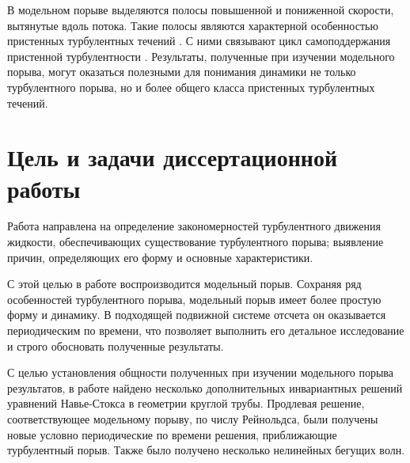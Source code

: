 \begin{comment}
Решение, соответствующее модельному порыву, может быть непрерывным образом продлено по параметрам, что позволяет получить новые условно периодические решения, характеристики которых могут оказаться ближе к характеристика турбулентного течения \cite{Viswanath2007, Dijkstra2014}. Продлевая решение, соответствующее модельному порыву, в сторону уменьшения числа Рейнольдса, удается достичь точки бифуркации, в которой возникает две ветви решения, и перейти с нижней на верхнюю \cite{Avila2013}. Решения с верхней ветви сохраняют свойство пространственной локализации и простое поведение во времени, однако их характеристики оказываются ближе к характеристика турбулентного течения. Если нижняя ветвь решения проходит по границе области притяжения, соответствующей турбулентному режиму течения, решения с верхней ветви могут участвовать в организации турбулентного аттрактора. Мы полагаем, что сравнение решений с нижней и верхней ветвей позволит выделить закономерности более общего характера. 
\end{comment}

В модельном порыве выделяются полосы повышенной и пониженной скорости, вытянутые вдоль потока. Такие полосы являются характерной особенностью пристенных турбулентных течений \cite{Klebanoff1962, Kline1967}. С ними связывают цикл самоподдержания пристенной турбулентности \cite{Hamilton1995, Waleffe1997, Schoppa2002}. Результаты, полученные при изучении модельного порыва, могут оказаться полезными для понимания динамики не только турбулентного порыва, но и более общего класса пристенных турбулентных течений. 


\section{Цель и задачи диссертационной работы}

Работа направлена на определение закономерностей турбулентного движения жидкости, обеспечивающих существование турбулентного порыва; выявление причин, определяющих его форму и основные характеристики. 

С этой целью в работе воспроизводится модельный порыв. Сохраняя ряд особенностей турбулентного порыва, модельный порыв имеет более простую форму и динамику. В подходящей подвижной системе отсчета он оказывается периодическим по времени, что позволяет выполнить его детальное исследование и строго обосновать полученные результаты. 

С целью установления общности полученных при изучении модельного порыва результатов, в работе найдено несколько дополнительных инвариантных решений уравнений Навье-Стокса в геометрии круглой трубы. Продлевая решение, соответствующее модельному порыву, по числу Рейнольдса, были получены новые условно периодические по времени решения, приближающие турбулентный порыв. Также было получено несколько нелинейных бегущих волн. 


